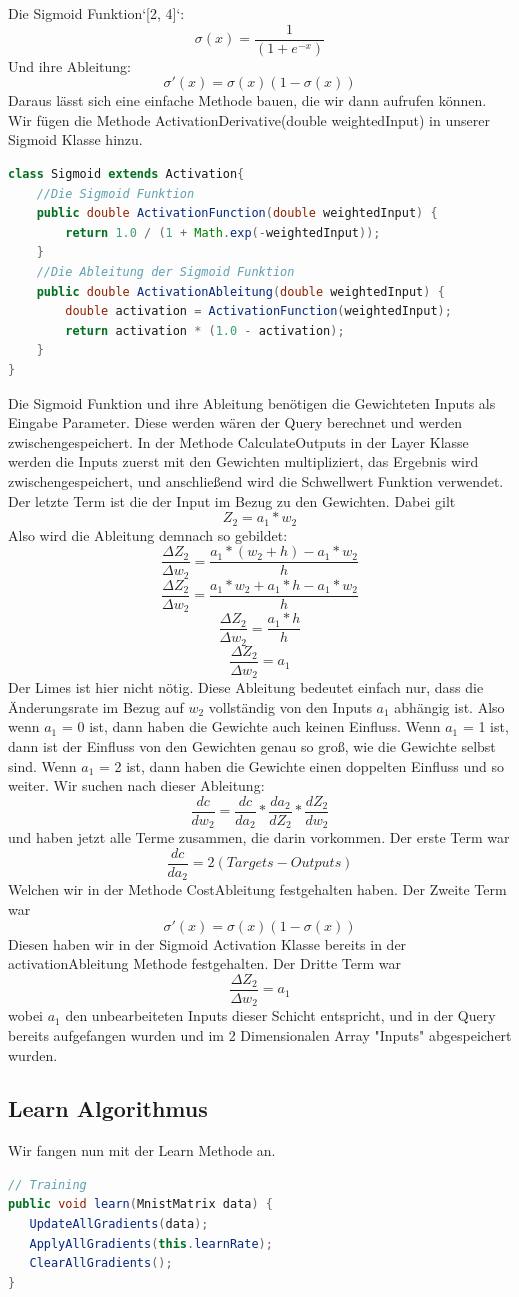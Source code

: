 \documentclass[12pt]{article}
\begin{document}
Die Sigmoid Funktion`[2, 4]`:
$$\sigma (x)=\frac{1}{(1+e^{-x})}$$
Und ihre Ableitung:
$$\sigma '(x)=\sigma (x)(1-\sigma(x))$$
Daraus lässt sich eine einfache Methode bauen, die wir dann aufrufen können. Wir fügen die Methode ActivationDerivative(double weightedInput) in unserer Sigmoid Klasse hinzu.\begin{lstlisting}[language=Java]
class Sigmoid extends Activation{
    //Die Sigmoid Funktion
    public double ActivationFunction(double weightedInput) {
        return 1.0 / (1 + Math.exp(-weightedInput));
    }
    //Die Ableitung der Sigmoid Funktion
    public double ActivationAbleitung(double weightedInput) {
        double activation = ActivationFunction(weightedInput);
        return activation * (1.0 - activation);
    }
}
\end{lstlisting}
Die Sigmoid Funktion und ihre Ableitung benötigen die Gewichteten Inputs als Eingabe Parameter. Diese werden wären der Query berechnet und werden zwischengespeichert. In der Methode CalculateOutputs in der Layer Klasse werden die Inputs zuerst mit den Gewichten multipliziert, das Ergebnis wird zwischengespeichert, und anschließend wird die Schwellwert Funktion verwendet. Der letzte Term ist die der Input im Bezug zu den Gewichten.
Dabei gilt 
$$Z_2 = a_1*w_2$$
Also wird die Ableitung demnach so gebildet:
$$\frac{\Delta Z_2}{\Delta w_2}=\frac{a_1*(w_2+h)-a_1*w_2}{h}$$
$$\frac{\Delta Z_2}{\Delta w_2}=\frac{a_1*w_2+a_1*h-a_1*w_2}{h}$$
$$\frac{\Delta Z_2}{\Delta w_2}=\frac{a_1*h}{h}$$
$$\frac{\Delta Z_2}{\Delta w_2}=a_1$$
Der Limes ist hier nicht nötig. Diese Ableitung bedeutet einfach nur, dass die Änderungsrate im Bezug auf $w_2$ vollständig von den Inputs $a_1$ abhängig ist. Also wenn $a_1$ = 0 ist, dann haben die Gewichte auch keinen Einfluss. Wenn $a_1$ = 1 ist, dann ist der Einfluss von den Gewichten genau so groß, wie die Gewichte selbst sind. Wenn $a_1$ = 2 ist, dann haben die Gewichte einen doppelten Einfluss und so weiter. Wir suchen nach dieser Ableitung:
$$\frac{ dc }{ dw_{ 2 } }=
\frac{ dc }{ da_{ 2 } }*
\frac{ da_{ 2 } }{ dZ_{ 2 } }*
\frac{ dZ_{ 2 } }{ dw_{ 2 } }$$
und haben jetzt alle Terme zusammen, die darin vorkommen. Der erste Term war 
$$\frac{dc}{da_2}=2(Targets-Outputs)$$
Welchen wir in der Methode CostAbleitung festgehalten haben.
Der Zweite Term war
$$\sigma '(x)=\sigma (x)(1-\sigma(x))$$
Diesen haben wir in der Sigmoid Activation Klasse bereits in der activationAbleitung Methode festgehalten.
Der Dritte Term war
$$\frac{\Delta Z_2}{\Delta w_2}=a_1$$
wobei $a_1$ den unbearbeiteten Inputs dieser Schicht entspricht, und in der Query bereits aufgefangen wurden und im 2 Dimensionalen Array "Inputs" abgespeichert wurden.\subsection{Learn Algorithmus}Wir fangen nun mit der Learn Methode an.\begin{lstlisting}[language=Java]
// Training
public void learn(MnistMatrix data) {
   UpdateAllGradients(data);
   ApplyAllGradients(this.learnRate);
   ClearAllGradients();
}
\end{lstlisting}
\end{document}
